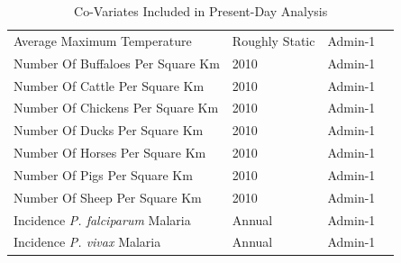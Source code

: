 \documentclass{article}
\begin{document}
\begin{table}[H]
\begin{tabular}{llll}
		Average Maximum Temperature & Roughly Static & Admin-1 & \cite{Sheffield2006} \\
		Number Of Buffaloes Per Square Km & 2010 & Admin-1 & \cite{Robinson2014} \\
		Number Of Cattle Per Square Km & 2010 & Admin-1 & \cite{Robinson2014} \\
		Number Of Chickens Per Square Km & 2010 & Admin-1 & \cite{Robinson2014} \\
		Number Of Ducks Per Square Km & 2010 & Admin-1 & \cite{Robinson2014} \\
		Number Of Horses Per Square Km & 2010 & Admin-1 & \cite{Robinson2014} \\
		Number Of Pigs Per Square Km & 2010 & Admin-1 & \cite{Robinson2014} \\
		Number Of Sheep Per Square Km & 2010 & Admin-1 & \cite{Robinson2014} \\
		Incidence \textit{P. falciparum} Malaria & Annual & Admin-1 & \cite{Weiss2019} \\
		Incidence \textit{P. vivax} Malaria & Annual & Admin-1 & \cite{Weiss2019} \\
		\bottomrule
	\end{tabular}
	\caption{Co-Variates Included in Present-Day Analysis}
	\label{tab:covars1}
\end{table}
\end{document}
